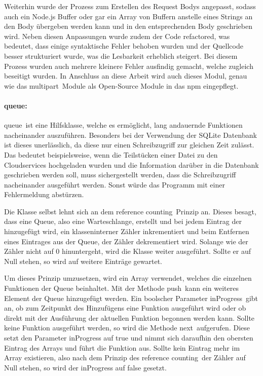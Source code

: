 Weiterhin wurde der Prozess zum Erstellen des Request Bodys angepasst, sodass auch ein Node.js Buffer oder gar ein Array von Buffern anstelle eines Strings an den Body übergeben werden kann und in den entsprechenden Body geschrieben wird.
Neben diesen Anpassungen wurde zudem der Code refactored, was bedeutet, dass einige syntaktische Fehler behoben wurden und der Quellcode besser strukturiert wurde, was die Lesbarkeit erheblich steigert.
Bei diesem Prozess wurden auch mehrere kleinere Fehler ausfindig gemacht, welche zugleich beseitigt wurden.
In Anschluss an diese Arbeit wird auch dieses Modul, genau wie das \frqq multipart\flqq\ Module als Open-Source Module in das npm eingepflegt.

\paragraph{queue:}
\frqq queue\flqq\ ist eine Hilfsklasse, welche es ermöglicht, lang andauernde Funktionen nacheinander auszuführen.
Besonders bei der Verwendung der SQLite Datenbank ist dieses unerlässlich, da diese nur einen Schreibzugriff zur gleichen Zeit zulässt.
Das bedeutet beispielsweise, wenn die Teilstücken einer Datei zu den Cloudservices hochgeladen wurden und die Information darüber in die Datenbank geschrieben werden soll, muss sichergestellt werden, dass die Schreibzugriff nacheinander ausgeführt werden.
Sonst würde das Programm mit einer Fehlermeldung abstürzen.

Die Klasse selbst lehnt sich an dem \frqq reference counting\flqq\ Prinzip an.
Dieses besagt, dass eine Queue, also eine Warteschlange, erstellt und bei jedem Eintrag der hinzugefügt wird, ein klasseninterner Zähler inkrementiert und beim Entfernen eines Eintrages aus der Queue, der Zähler dekrementiert wird.
Solange wie der Zähler nicht auf 0 hinuntergeht, wird die Klasse weiter ausgeführt.
Sollte er auf Null stehen, so wird auf weitere Einträge gewartet.

Um dieses Prinzip umzusetzen, wird ein Array verwendet, welches die einzelnen Funktionen der Queue beinhaltet.
Mit der Methode \frqq push\flqq\ kann ein weiteres Element der Queue hinzugefügt werden.
Ein boolscher Parameter \frqq inProgress\flqq\ gibt an, ob zum Zeitpunkt des Hinzufügens eine Funktion ausgeführt wird oder ob direkt mit der Ausführung der aktuellen Funktion begonnen werden kann.
Sollte keine Funktion ausgeführt werden, so wird die Methode \frqq next\flqq\ aufgerufen.
Diese setzt den Parameter inProgress auf true und nimmt sich daraufhin den obersten Eintrag des Arrays und führt die Funktion aus.
Sollte kein Eintrag mehr im Array existieren, also nach dem Prinzip des \frqq reference counting\flqq\ der Zähler auf Null stehen, so wird der inProgress auf false gesetzt.

